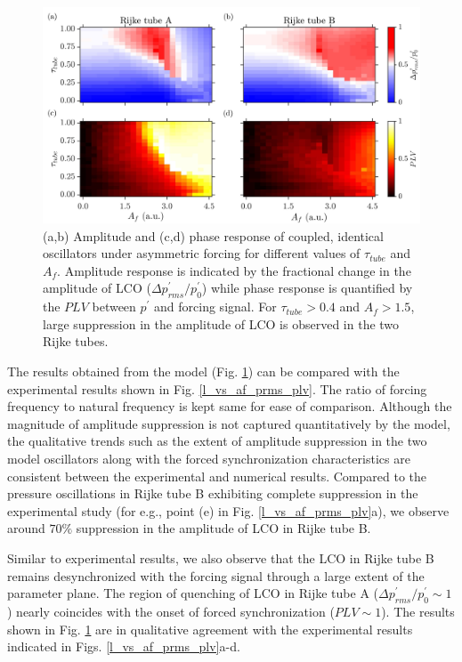 \documentclass[%
preprint,
 amsmath,amssymb,
 aps,
 pra,
]{revtex4-2}
\begin{document}
\begin{figure}[t!]
\centering
\includegraphics[scale=0.16]{fig10.jpg}
\caption{\label{Af_vs_kt} (a,b) Amplitude and (c,d) phase response of coupled, identical oscillators under asymmetric forcing for different values of $\tau_{tube}$ and $A_f$. Amplitude response is indicated by the fractional change in the amplitude of LCO ($\Delta p^\prime_{rms}/p^\prime_{0}$) while phase response is quantified by the $PLV$ between $p^\prime$ and forcing signal. For $\tau_{tube}>0.4$ and $A_f>1.5$, large suppression in the amplitude of LCO is observed in the two Rijke tubes.}
\end{figure}

The results obtained from the model (Fig. \ref{Af_vs_kt}) can be compared with the experimental results shown in Fig. \ref{l_vs_af_prms_plv}. The ratio of forcing frequency to natural frequency is kept same for ease of comparison. Although the magnitude of amplitude suppression is not captured quantitatively by the model, the qualitative trends such as the extent of amplitude suppression in the two model oscillators along with the forced synchronization characteristics are consistent between the experimental and numerical results. Compared to the pressure oscillations in Rijke tube B exhibiting complete suppression in the experimental study (for e.g., point (e) in Fig. \ref{l_vs_af_prms_plv}a), we observe around $70 \%$ suppression in the amplitude of LCO in Rijke tube B. 

Similar to experimental results, we also observe that the LCO in Rijke tube B remains desynchronized with the forcing signal through a large extent of the parameter plane. The region of quenching of LCO in Rijke tube A ($\Delta p^\prime_{rms}/p^\prime_{0} \sim 1$) nearly coincides with the onset of forced synchronization ($PLV \sim 1$). The results shown in Fig. \ref{Af_vs_kt} are in qualitative agreement with the experimental results indicated in Figs. \ref{l_vs_af_prms_plv}a-d.
\end{document}
